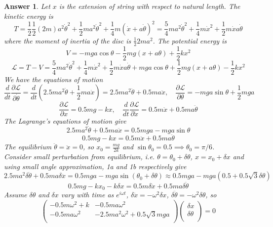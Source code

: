 \documentclass[a4paper]{article}
\newtheorem{ans}{Answer}[section]
\theoremstyle{new}
\begin{document}
\begin{ans}
Let $x$ is the extension of string with respect to natural length. The kinetic energy is
$$T=\frac{1}{2}\frac{1}{2}(2m)a^2\dot{\theta}^2+\frac{1}{2}ma^2\dot{\theta}^2+\frac{1}{4}m(\dot{x}+a\dot{\theta})^2=\frac{5}{4}ma^2\dot{\theta}^2+\frac{1}{4}m\dot{x}^2+\frac{1}{2}m\dot{x}a\dot{\theta}$$
where the moment of inertia of the disc is $\frac{1}{2}2ma^2$. The potential energy is
$$V=-mga\cos\theta-\frac{1}{2}mg(x+a\theta)+\frac{1}{2}kx^2$$
$$\mathcal{L}=T-V=\frac{5}{4}ma^2\dot{\theta}^2+\frac{1}{4}m\dot{x}^2+\frac{1}{2}m\dot{x}a\dot{\theta}+mga\cos\theta+\frac{1}{2}mg(x+a\theta)-\frac{1}{2}kx^2$$
We have the equations of motion
$$\frac{d}{dt}\frac{\partial\mathcal{L}}{\partial\dot{\theta}}=\frac{d}{dt}(2.5ma^2\dot{\theta}+\frac{1}{2}ma\dot{x})=2.5ma^2\ddot{\theta}+0.5ma\ddot{x},\quad\frac{\partial\mathcal{L}}{\partial\theta}=-mga\sin\theta+\frac{1}{2}mga$$
$$\frac{\partial\mathcal{L}}{\partial x}=0.5mg-kx,\quad\frac{d}{dt}\frac{\partial\mathcal{L}}{\partial\dot{x}}=0.5m\ddot{x}+0.5ma\ddot{\theta}$$
The Lagrange's equations of motion give
\begin{equation}
2.5ma^2\ddot{\theta}+0.5ma\ddot{x}=0.5mga-mga\sin\theta\tag{1a}
\end{equation}
\begin{equation}
0.5mg-kx=0.5m\ddot{x}+0.5ma\ddot{\theta}\tag{1b}
\end{equation}
The equilibrium $\ddot{\theta}=\ddot{x}=0$, so $x_0=\frac{mg}{2k}$ and $\sin\theta_0=0.5\implies\theta_0=\pi/6$.\\[5pt]
Consider small perturbation from equilibrium, i.e. $\theta=\theta_0+\delta\theta$, $x=x_0+\delta x$ and using small angle approximation, 1a and 1b respectively give
$$2.5ma^2\delta\ddot{\theta}+0.5ma\delta\ddot{x}=0.5mga-mga\sin(\theta_0+\delta\theta)\approx0.5mga-mga(0.5+0.5\sqrt{3}\delta\theta)$$
$$0.5mg-kx_0-k\delta x=0.5m\delta\ddot{x}+0.5ma\delta\ddot{\theta}$$
Assume $\delta\theta$ and $\delta x$ vary with time as $e^{i\omega t}$, $\delta\ddot{x}=-\omega^2\delta x$, $\delta\ddot{\theta}=-\omega^2\delta\theta$, so
$$\begin{pmatrix}-0.5m\omega^2+k&-0.5ma\omega^2\\-0.5ma\omega^2&-2.5ma^2\omega^2+0.5\sqrt{3}mga\\\end{pmatrix}\begin{pmatrix}\delta x\\\delta\theta\\\end{pmatrix}=0$$

\end{ans}
\end{document}
